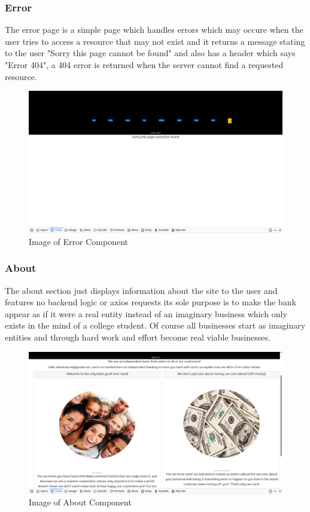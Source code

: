 \subsubsection{Error}
The error page is a simple page which handles errors which may occure when the user tries to
access a resource that may not exist and it returns a message stating to the user "Sorry this page cannot be found"
and also has a header which says "Error 404", a 404 error is returned when the server cannot find a requested resource.
\begin{figure}[H]
\includegraphics[width=\textwidth]{img/errorcomponent.png}
\caption{Image of Error Component}
\label{fig:Image of Error component}
\end{figure}
\subsubsection{About}
The about section just displays information about the site to the user and features no backend logic or axios requests
its sole purpose is to make the bank appear as if it were a real entity instead of an imaginary business which only
exists in the mind of a college student.  Of course all businesses start as imaginary entities and through hard work
and effort become real viable businesses.
\begin{figure}[H]
\includegraphics[width=\textwidth]{img/aboutcomponent.png}
\caption{Image of About Component}
\label{fig:Image of about component}
\end{figure}
